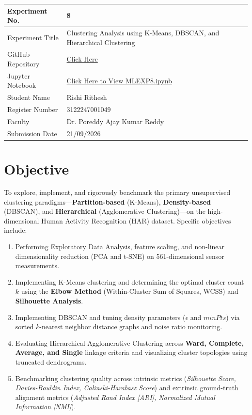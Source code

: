 \documentclass[12pt,a4paper]{article}
\begin{document}
\begin{tabular}{|p{4cm}|p{11cm}|}
\hline
Experiment No. & 8\\ \hline
Experiment Title & Clustering Analysis using K-Means, DBSCAN, and Hierarchical Clustering\\ \hline
GitHub Repository & \href{https://github.com/rishirithesh/ML_Lab}{Click Here} \\ \hline
Jupyter Notebook & \href{https://github.com/rishirithesh/ML_Lab/blob/main/MLEXP8.ipynb}{Click Here to View MLEXP8.ipynb} \\ \hline
Student Name & Rishi Rithesh\\ \hline
Register Number & 3122247001049\\ \hline
Faculty & Dr. Poreddy Ajay Kumar Reddy \\ \hline
Submission Date & 21/09/2026\\ \hline
\end{tabular}

\vspace{0.4cm}

\section{Objective}
To explore, implement, and rigorously benchmark the primary unsupervised clustering paradigms—\textbf{Partition-based} (K-Means), \textbf{Density-based} (DBSCAN), and \textbf{Hierarchical} (Agglomerative Clustering)—on the high-dimensional Human Activity Recognition (HAR) dataset. Specific objectives include:
\begin{enumerate}[label=\alph*)]
    \item Performing Exploratory Data Analysis, feature scaling, and non-linear dimensionality reduction (PCA and t-SNE) on 561-dimensional sensor measurements.
    \item Implementing K-Means clustering and determining the optimal cluster count $k$ using the \textbf{Elbow Method} (Within-Cluster Sum of Squares, WCSS) and \textbf{Silhouette Analysis}.
    \item Implementing DBSCAN and tuning density parameters ($\epsilon$ and $minPts$) via sorted $k$-nearest neighbor distance graphs and noise ratio monitoring.
    \item Evaluating Hierarchical Agglomerative Clustering across \textbf{Ward, Complete, Average, and Single} linkage criteria and visualizing cluster topologies using truncated dendrograms.
    \item Benchmarking clustering quality across intrinsic metrics (\textit{Silhouette Score, Davies-Bouldin Index, Calinski-Harabasz Score}) and extrinsic ground-truth alignment metrics (\textit{Adjusted Rand Index [ARI], Normalized Mutual Information [NMI]}).
\end{enumerate}
\end{document}

